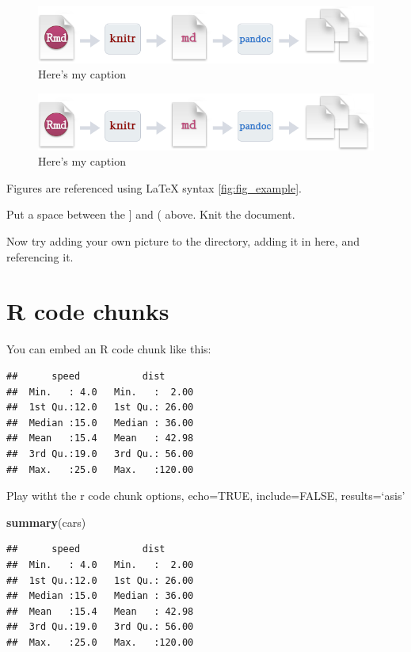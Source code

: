 \documentclass[12pt,]{article}
\newenvironment{Shaded}{\begin{snugshade}}{\end{snugshade}}
\newcommand{\KeywordTok}[1]{\textcolor[rgb]{0.13,0.29,0.53}{\textbf{{#1}}}}
\newcommand{\NormalTok}[1]{{#1}}
\begin{document}
\begin{figure}[htbp]
\centering
\includegraphics{Fig_Example/RMarkdownFLow.png}
\caption{Here's my caption \label{fig:fig_example2}}
\end{figure}

\begin{figure}[htbp]
\centering
\includegraphics{./Fig_Example/RMarkdownFLow.png}
\caption{Here's my caption \label{fig:fig_example3}}
\end{figure}

Figures are referenced using LaTeX syntax \ref{fig:fig_example}.

Put a space between the {]} and ( above. Knit the document.

Now try adding your own picture to the directory, adding it in here, and
referencing it.

\section{R code chunks}\label{r-code-chunks}

You can embed an R code chunk like this:

\begin{verbatim}
##      speed           dist       
##  Min.   : 4.0   Min.   :  2.00  
##  1st Qu.:12.0   1st Qu.: 26.00  
##  Median :15.0   Median : 36.00  
##  Mean   :15.4   Mean   : 42.98  
##  3rd Qu.:19.0   3rd Qu.: 56.00  
##  Max.   :25.0   Max.   :120.00
\end{verbatim}

Play witht the r code chunk options, echo=TRUE, include=FALSE,
results=`asis'

\begin{Shaded}
\begin{Highlighting}[]
    \KeywordTok{summary}\NormalTok{(cars)}
\end{Highlighting}
\end{Shaded}

\begin{verbatim}
##      speed           dist       
##  Min.   : 4.0   Min.   :  2.00  
##  1st Qu.:12.0   1st Qu.: 26.00  
##  Median :15.0   Median : 36.00  
##  Mean   :15.4   Mean   : 42.98  
##  3rd Qu.:19.0   3rd Qu.: 56.00  
##  Max.   :25.0   Max.   :120.00
\end{verbatim}
\end{document}
